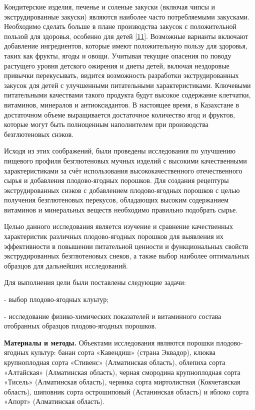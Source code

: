 {Кондитерские изделия, печенье и соленые закуски (включая чипсы и
экструдированные закуски) являются наиболее часто потребляемыми
закусками. Необходимо сделать больше в плане производства закусок с
положительной пользой для здоровья, особенно для детей
{[}\href{https://www.sciencedirect.com/science/article/pii/S002364381200463X\#bib37}{11}{]}.
Возможные варианты включают добавление ингредиентов, которые имеют
положительную пользу для здоровья, таких как фрукты, ягоды и овощи.
Учитывая текущие опасения по поводу растущего уровня детского ожирения и
диеты детей, включая нездоровые привычки перекусывать, видится
возможность разработки экструдированных закусок для детей с улучшенными
питательными характеристиками. Ключевыми питательными качествами такого
продукта будут высокое содержание клетчатки, витаминов, минералов и
антиоксидантов. В настоящее время, в Казахстане в достаточном объеме
выращивается достаточное количество ягод и фруктов, которые могут быть
полноценным наполнителем при производства безглютеновых снэков.

Исходя из этих соображений, были проведены исследования по улучшению
пищевого профиля безглютеновых мучных изделий с высокими качественными
характеристиками за счёт использования высококачественного
отечественного сырья и добавления плодово-ягодных порошков. Для создания
рецептуры экструдированных снэков с добавлением плодово-ягодных порошков
с целью получения безглютеновых перекусов, обладающих высоким
содержанием витаминов и минеральных веществ необходимо правильно
подобрать сырье.

Целью данного исследования является изучение и сравнение качественных
характеристик различных плодово-ягодных порошков для выявления их
эффективности в повышении питательной ценности и функциональных свойств
экструдированных безглютеновых снеков, а также выбор наиболее
оптимальных образцов для дальнейших исследований.

Для выполнения цели были поставлены следующие задачи:

- выбор плодово-ягодных клуьтур;

- исследование физико-химических показателей и витаминного состава
отобранных образцов плодово-ягодных порошков.

{\bfseries Материалы и методы.} Объектами исследования являются порошки
плодово-ягодных культур: банан сорта «Кавендиш» (страна Эквадор), клюква
крупноплодная сорта «Стивенс» (Алматинская область), облепиха сорта
«Алтайская» (Алматинская область), черная смородина крупноплодная сорта
«Тисель» (Алматинская область), черника сорта миртолистная (Кокчетавская
область), шиповник сорта острошиповый (Астанинская область) и яблоко
сорта «Апорт» (Алматинская область).

}
